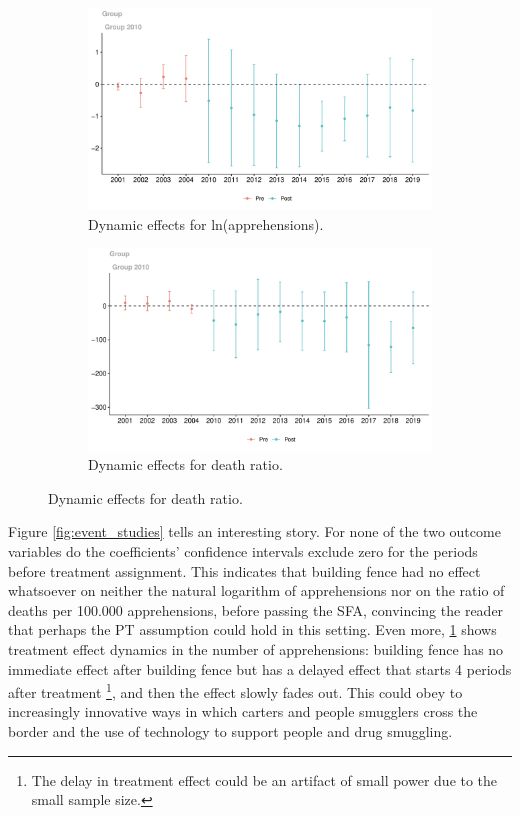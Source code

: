 \documentclass[titlepage]{article}
\theoremstyle{plain}
\theoremstyle{plain}
\begin{document}
\begin{figure}
	\caption{Event study for the outcome variables.}
	\label{fig:event_studies}
	\centering
	\begin{subfigure}[b]{0.48\textwidth}
		\caption{Dynamic effects for ln(apprehensions).}
		\label{fig:es_app}
		\centering
		\includegraphics[width=\textwidth]{_images/plot_es_app.pdf}
	\end{subfigure}
	\begin{subfigure}[b]{0.48\textwidth}
		\caption{Dynamic effects for death ratio.}
		\label{fig:es_death}
		\centering
		\includegraphics[width=\textwidth]{_images/plot_es_death.pdf}
	\end{subfigure}
\end{figure}

Figure \ref{fig:event_studies} tells an interesting story. For none of the two outcome variables do the coefficients’ confidence intervals exclude zero for the periods before treatment assignment. This indicates that building fence had no effect whatsoever on  neither the natural logarithm of apprehensions nor on the ratio of deaths per 100.000 apprehensions, before passing the SFA, convincing the reader that perhaps the PT assumption could hold in this setting. Even more, \ref{fig:es_app} shows treatment effect dynamics in the number of apprehensions: building fence has no immediate effect after building fence but has a delayed effect that starts 4 periods after treatment \footnote{The delay in treatment effect could be an artifact of small power due to the small sample size.}, and then the effect slowly fades out. This could obey to increasingly innovative ways in which carters and people smugglers cross the border and the use of technology to support people and drug smuggling.
\end{document}
